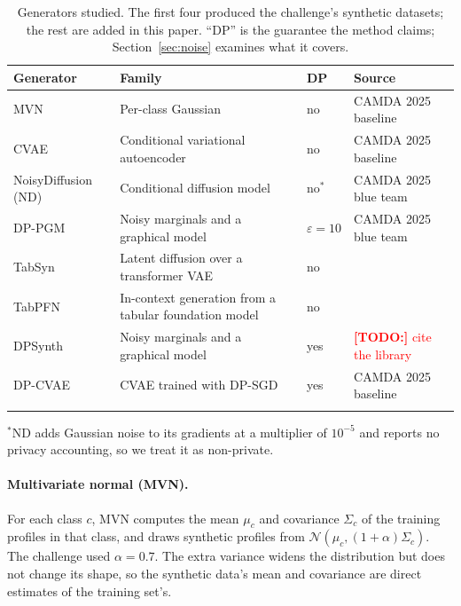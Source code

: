 \documentclass[webpdf,contemporary,large]{oup-authoring-template}
\newif\ifdraft \drafttrue
\newcommand{\annot}[3]{\ifdraft\textcolor{#1}{\textbf{[#2:]} #3}\fi}
\newcommand{\todo}[1]{\annot{red}{TODO}{#1}}
\begin{document}
\begin{table}[!t]
\caption{Generators studied. The first four produced the challenge's synthetic datasets; the rest are added in this paper. ``DP'' is the guarantee the method claims; Section~\ref{sec:noise} examines what it covers.\label{tab:generators}}
\begin{tabular}{L{3.0cm} L{4.6cm} L{1.6cm} L{6.0cm}}
  \toprule
  \textbf{Generator} & \textbf{Family} & \textbf{DP} & \textbf{Source} \\
  \midrule
  MVN & Per-class Gaussian & no & CAMDA 2025 baseline \citep{ozturk2026towards} \\
  CVAE & Conditional variational autoencoder & no & CAMDA 2025 baseline \citep{sohn2015learning,ozturk2026towards} \\
  NoisyDiffusion (ND) & Conditional diffusion model & no$^{\ast}$ & CAMDA 2025 blue team \citep{kreuer2025noisydiffusion} \\
  DP-PGM & Noisy marginals and a graphical model & $\varepsilon=10$ & CAMDA 2025 blue team \citep{menzies2025,chen2024biologically,mckenna2019graphical} \\
  \midrule
  TabSyn & Latent diffusion over a transformer VAE & no & \citep{zhang2023mixed} \\
  TabPFN & In-context generation from a tabular foundation model & no & \citep{hollmann2025tabpfn} \\
  DPSynth & Noisy marginals and a graphical model & yes & \todo{cite the library} \\
  DP-CVAE & CVAE trained with DP-SGD & yes & CAMDA 2025 baseline \citep{abadi_deep_2016,ozturk2026towards} \\
  \botrule
\end{tabular}
\begin{tablenotes}
\item $^{\ast}$ND adds Gaussian noise to its gradients at a multiplier of $10^{-5}$ and reports no privacy accounting, so we treat it as non-private.
\end{tablenotes}
\end{table}

\paragraph{Multivariate normal (MVN).}
For each class $c$, MVN computes the mean $\mu_c$ and covariance $\Sigma_c$ of the training profiles in that class, and draws synthetic profiles from $\mathcal{N}(\mu_c, (1+\alpha)\Sigma_c)$. The challenge used $\alpha = 0.7$. The extra variance widens the distribution but does not change its shape, so the synthetic data's mean and covariance are direct estimates of the training set's.
\end{document}
